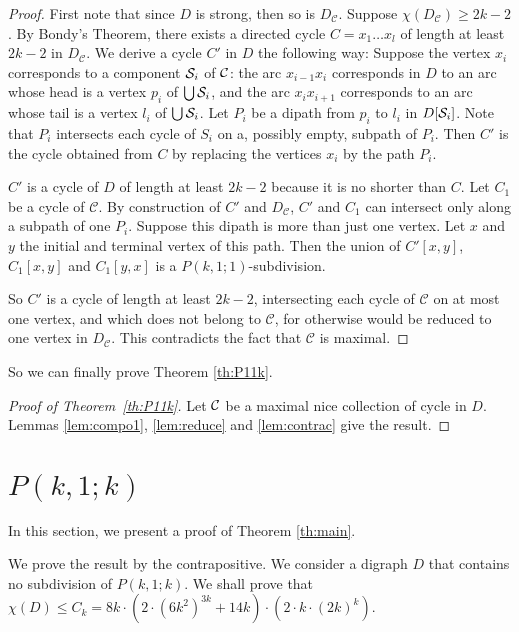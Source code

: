 \documentclass[utf8,10pt]{article}
\theoremstyle{plain}
\theoremstyle{definition}
\theoremstyle{remark}
\newcommand{\cste}{ 8k \cdot (2\cdot \col + 14k) \cdot (2 \cdot \dr)}
\newcommand{\dr}{ k \cdot (2k)^k}
\newcommand{\col}{(6k^2)^{3k}}
\begin{document}
\begin{proof}
First note that since $D$ is strong, then so is $D_{\mathcal{C}}$. Suppose $\chi(D_{\mathcal{C}}) \geq 2k-2$. By Bondy's Theorem, there exists a directed cycle
$C = x_1\dots x_l$ of length at least $2k-2$ in $ D_{\mathcal{C}}$. We derive a cycle $C'$ in $D$ the following way:
Suppose the vertex $x_i$ corresponds to a component ${\cal S}_i$ of ${\cal C}$: the arc $x_{i-1}x_i$ corresponds in $D$ to an arc whose head
is a vertex $p_i$ of $\bigcup {\cal S}_i$, and the arc $x_ix_{i+1}$ corresponds to an arc whose tail is a vertex  $l_i$ of $\bigcup {\cal S}_i$. 
Let $P_i$ be a dipath 
from $p_i$ to $l_i$ in $D[{\cal S}_i]$. Note that $P_i$ intersects each cycle of $S_i$ on a, possibly empty, subpath of $P_i$. 
Then $C'$ is the cycle obtained from $C$ by replacing the vertices $x_i$ by the path $P_i$.

$C'$ is a cycle of $D$ of length at least $2k-2$ because it is no shorter than $C$. Let $C_1$ be a cycle of $\mathcal{C}$. By construction of $C'$ 
and $D_{\mathcal{C}}$, $C'$ and $C_1$ can intersect only along a subpath of one $P_i$. Suppose this dipath is more than just one vertex. Let $x$ and
$y$ the initial and terminal vertex of this path. Then the union of $C'[x,y]$,
$C_1[x,y]$ and $C_1[y,x]$ is a $P(k,1;1)$-subdivision.

So $C'$ is a cycle of length at least $2k-2$, intersecting each cycle of $\mathcal{C}$ on at most one vertex, and which does not belong to $\mathcal{C}$, for otherwise would be reduced
to one vertex in $D_{\mathcal{C}}$. This contradicts the fact that $\mathcal{C}$ is maximal.
\end{proof}

So we can finally prove Theorem \ref{th:P11k}.

\begin{proof}[Proof of Theorem~\ref{th:P11k}]
Let ${\cal C}$ be a maximal nice collection of cycle in $D$.  Lemmas \ref{lem:compo1}, \ref{lem:reduce} and \ref{lem:contrac} give the result.
\end{proof}


\section{$P(k,1;k)$}\label{sec:main}

In this section, we present a proof of Theorem \ref{th:main}.

We prove the result by the contrapositive. We consider a digraph $D$ that contains no subdivision of $P(k,1;k)$.
We shall prove that $\chi(D) \leq  C_k= \cste$.
\end{document}
